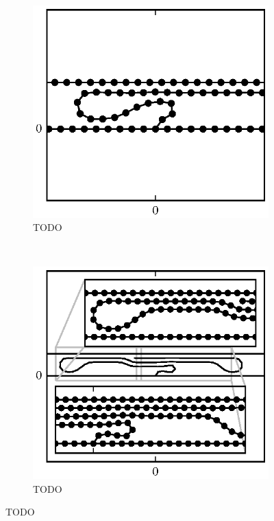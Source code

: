 	\begin{figure}
		\centering
		\begin{subfigure}{.5\textwidth}
			\centering
			\includegraphics{./fig/ch3/push/ref/l17_m11.eps}
			\caption{TODO \label{subfig:push_curled1}}
		\end{subfigure}%
		~
		\begin{subfigure}{.5\textwidth}
			\centering
			\includegraphics{./fig/ch3/push/ref/l5.9_m0.1.eps}
			\caption{TODO\label{subfig:push_curled2}}
		\end{subfigure}
		\caption{TODO\label{fig:push_ref_special}}
	\end{figure}

